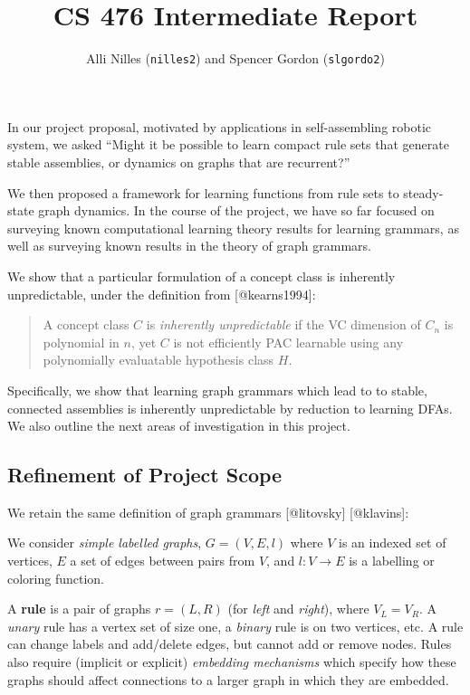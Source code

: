 \documentclass[]{article}
\title{CS 476 Intermediate Report}
\author{Alli Nilles (\texttt{nilles2}) and Spencer Gordon (\texttt{slgordo2})}
\date{}
\begin{document}
\maketitle

\newcommand{\step}[1]{\xrightarrow{#1}}

In our project proposal, motivated by applications in self-assembling
robotic system, we asked ``Might it be possible to learn compact rule
sets that generate stable assemblies, or dynamics on graphs that are
recurrent?''

We then proposed a framework for learning functions from rule sets to
steady-state graph dynamics. In the course of the project, we have so
far focused on surveying known computational learning theory results for
learning grammars, as well as surveying known results in the theory of
graph grammars.

We show that a particular formulation of a concept class is inherently
unpredictable, under the definition from {[}@kearns1994{]}:

\begin{quote}
A concept class \(C\) is \emph{inherently unpredictable} if the VC
dimension of \(C_n\) is polynomial in \(n\), yet \(C\) is not
efficiently PAC learnable using any polynomially evaluatable hypothesis
class \(H\).
\end{quote}

Specifically, we show that learning graph grammars which lead to to
stable, connected assemblies is inherently unpredictable by reduction to
learning DFAs. We also outline the next areas of investigation in this
project.

\subsection{Refinement of Project
Scope}\label{refinement-of-project-scope}

We retain the same definition of graph grammars {[}@litovsky{]}
{[}@klavins{]}:

We consider \emph{simple labelled graphs}, \(G = (V,E,l)\) where \(V\)
is an indexed set of vertices, \(E\) a set of edges between pairs from
\(V\), and \(l: V \to E\) is a labelling or coloring function.

A \textbf{rule} is a pair of graphs \(r=(L,R)\) (for \emph{left} and
\emph{right}), where \(V_L = V_R\). A \emph{unary} rule has a vertex set
of size one, a \emph{binary} rule is on two vertices, etc. A rule can
change labels and add/delete edges, but cannot add or remove nodes.
Rules also require (implicit or explicit) \emph{embedding mechanisms}
which specify how these graphs should affect connections to a larger
graph in which they are embedded.
\end{document}
